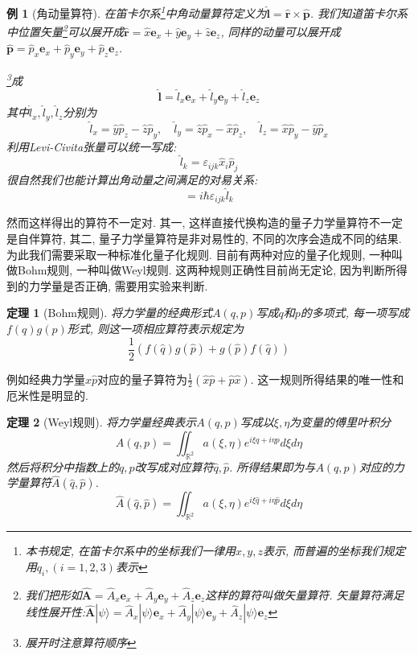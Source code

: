 \documentclass[a4paper,11pt]{book}
\newtheorem{theorem}{\hspace{2em}定理}[section]
\newtheorem{example}{例}[section]
\newcommand{\A}{\hat{A}}
\newcommand{\x}{\hat{x}}
\newcommand{\y}{\hat{y}}
\newcommand{\z}{\hat{z}}
\newcommand{\p}{\hat{p}}
\newcommand{\q}{\hat{q}}
\newcommand{\hl}{\hat{l}}
\begin{document}
\begin{example}[角动量算符]
  在笛卡尔系\footnote{本书规定, 在笛卡尔系中的坐标我们一律用$x,y,z$表示, 而普遍的坐标我们规定用$q_i,(i=1,2,3)$表示}中角动量算符定义为$\hat{\mathbf{l}}=\hat{\mathbf{r}}\times\hat{\mathbf{p}}$. 我们知道笛卡尔系中位置矢量\footnote{我们把形如$\hat{\mathbf{A}}=\hat{A}_x\mathbf{e}_x+\hat{A}_y\mathbf{e}_y+\hat{A}_z\mathbf{e}_z$这样的算符叫做矢量算符. 矢量算符满足线性展开性:$\hat{\mathbf{A}}|\psi\rangle=\hat{A}_x|\psi\rangle\mathbf{e}_x+\hat{A}_y|\psi\rangle\mathbf{e}_y+\hat{A}_z|\psi\rangle\mathbf{e}_z$}可以展开成$\hat{\mathbf{r}}=\hat{x}\mathbf{e} _x+\hat{y}\mathbf{e}_y+\hat{z}\mathbf{e}_z$, 同样的动量可以展开成$\hat{\mathbf{p}}=\hat{p}_x\mathbf{e} _x+\hat{p}_y\mathbf{e}_y+\hat{p}_z\mathbf{e}_z$.

  \footnote{展开时注意算符顺序}成
  \begin{equation*}
    \hat{\mathbf{l}}=\hat{l}_x\mathbf{e}_x+\hat{l}_y\mathbf{e}_y+\hat{l}_z\mathbf{e}_z
  \end{equation*}
  其中$\hl_x,\hl_y,\hl_z$分别为
  \begin{equation*}
    \hl_x=\y\p_z-\z\p_y,\quad\hl_y=\z\p_x-\x\p_z,\quad\hl_z=\x\p_y-\y\p_x
  \end{equation*}
  利用Levi-Civita张量可以统一写成:
  \begin{equation*}
    \hl_k=\varepsilon_{ijk}\x_i\p_j
  \end{equation*}
  很自然我们也能计算出角动量之间满足的对易关系:
  \begin{equation*}
    [\hl_i,\hl_j]=i\hbar\varepsilon_{ijk}\hl_k
  \end{equation*}
\end{example}
然而这样得出的算符不一定对. 其一, 这样直接代换构造的量子力学量算符不一定是自伴算符, 其二, 量子力学量算符是非对易性的, 不同的次序会造成不同的结果. 为此我们需要采取一种标准化量子化规则. 目前有两种对应的量子化规则, 一种叫做Bohm规则, 一种叫做Weyl规则. 这两种规则正确性目前尚无定论, 因为判断所得到的力学量是否正确, 需要用实验来判断.
\begin{theorem}[Bohm规则]
  将力学量的经典形式$A(q,p)$写成$q$和$p$的多项式, 每一项写成$f(q)g(p)$形式, 则这一项相应算符表示规定为
  \begin{equation*}
    \frac{1}{2}\left(f(\q)g(\p)+g(\p)f(\q)\right)
  \end{equation*}
\end{theorem}
例如经典力学量$\x\p$对应的量子算符为$\frac{1}{2}(\x\p+\p\x)$. 这一规则所得结果的唯一性和厄米性是明显的.
\begin{theorem}[Weyl规则]
  将力学量经典表示$A(q,p)$写成以$\xi,\eta$为变量的傅里叶积分
  \begin{equation*}
    A(q,p)=\iint_{\mathbb{R}^2} a(\xi,\eta)e^{i\xi q+i\eta p} d\xi d\eta
  \end{equation*}
  然后将积分中指数上的$q,p$改写成对应算符$\q,\p$. 所得结果即为与$A(q,p)$对应的力学量算符$\A(\q,\p)$.
  \begin{equation*}
    \A(\q,\p)=\iint_{\mathbb{R}^2}a(\xi,\eta)e^{i\xi\q+i\eta\p}d\xi d\eta
  \end{equation*}
\end{theorem}
\end{document}
